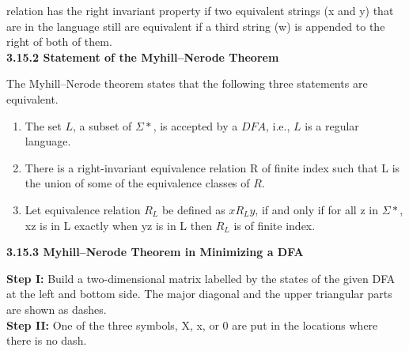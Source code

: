 \documentclass{article}
\begin{document}
\vspace*{0.5cm}
relation has the right invariant property if two equivalent strings (x and y) that are in the language still
are equivalent if a third string (w) is appended to the right of both of them.\\

\vspace*{0.2cm}
\large{
\textbf{3.15.2 Statement of the Myhill–Nerode Theorem}
}

\vspace*{0.1cm}
The Myhill–Nerode theorem states that the following three statements are equivalent.\\

\small{
\begin{enumerate}
  \item The set $L$, a subset of $\Sigma*$, is accepted by a $DFA$, i.e., $L$ is a regular language.\\
  \item There is a right-invariant equivalence relation R of finite index such that L is the union of some of
the equivalence classes of $R$.\\
  \item Let equivalence relation $R_L$ be defined as $xR_Ly$, if and only if for all z in $\Sigma*$, xz is in L exactly when
yz is in L then $R_L$ is of finite index.\\
\end{enumerate}
}
\vspace*{0.2cm}
\large{
\textbf{3.15.3 Myhill–Nerode Theorem in Minimizing a DFA}
}

\vspace*{0.1cm}

\textbf{Step I:} Build a two-dimensional matrix labelled by the states of the given DFA at the left and bottom
side. The major diagonal and the upper triangular parts are shown as dashes.\\

\vspace*{1mm}
\textbf{Step II:} One of the three symbols, X, x, or 0 are put in the locations where there is no dash.\\

\vspace*{0.1cm}
\end{document}
